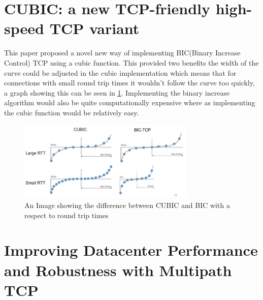 \documentclass[a4paper,12pt]{scrartcl}
\begin{document}
	\section{CUBIC: a new TCP-friendly high-speed TCP variant\cite{HaRheeXuCubic}}
	{
		This paper proposed a novel new way of implementing BIC(Binary Increase Control) TCP using a cubic function. This provided two benefits the width of the curve could be adjusted in the cubic implementation which means that for connections with small round trip times it wouldn't follow the curve too quickly, a graph showing this can be seen in \cref{fig:BICVsCubicRTT}. Implementing the binary increase algorithm would also be quite computationally expensive where as implementing the cubic function would be relatively easy.
		\begin{figure}[h]
			\centering
			\includegraphics[width=0.75\textwidth]{BICVsCubicRTT}
			\caption{An Image showing the difference between CUBIC and BIC with a respect to round trip times\cite{deawookim2015}}
			\label{fig:BICVsCubicRTT}
		\end{figure}
	}
	\section{Improving Datacenter Performance and Robustness with Multipath TCP\cite{RaiciuBarrePluntkeGreenhalghWischikHandleyMultipathTCPArticle}}
	{
		
	}
	\newpage
	\clearpage
	\printbibliography[heading=bibintoc,title=References]
\end{document}
